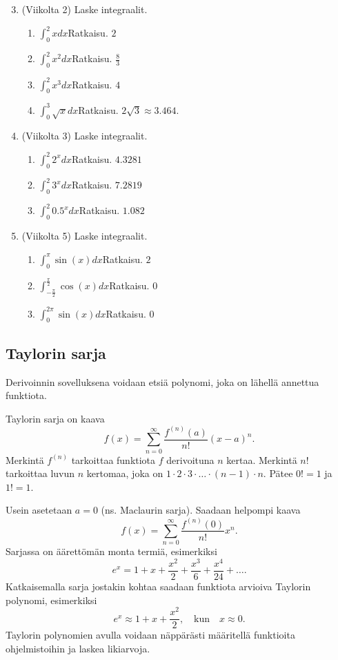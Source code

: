 \documentclass[10pt]{article}
\newcommand{\ratkaisu}[1]{\hfill{\color{blue}\quad\textrm{Ratkaisu. } #1}}
\begin{document}
\begin{enumerate}
\setcounter{enumi}{2}
\item (Viikolta 2) Laske integraalit.
\begin{enumerate}
\item $\int_0^2 xdx$\ratkaisu{$2$}
\item $\int_0^2 x^2dx$\ratkaisu{$\frac83$}
\item $\int_0^2 x^3dx$\ratkaisu{$4$}
\item $\int_0^3 \sqrt{x}dx$\ratkaisu{$2\sqrt{3}\approx 3.464.$}
\end{enumerate}
\item (Viikolta 3) Laske integraalit.
\begin{enumerate}
\item $\int_0^2 2^xdx$\ratkaisu{$4.3281$}
\item $\int_0^2 3^xdx$\ratkaisu{$7.2819$}
\item $\int_0^2 0.5^xdx$\ratkaisu{$1.082$}
\end{enumerate}
\item (Viikolta 5) Laske integraalit.
\begin{enumerate}
\item $\int_0^\pi \sin(x)dx$\ratkaisu{$2$}
\item $\int_{-\frac{\pi}{2}}^{\frac{\pi}{2}} \cos(x)dx$\ratkaisu{$0$}
\item $\int_0^{2\pi} \sin(x)dx$\ratkaisu{$0$}
\end{enumerate}
\end{enumerate}

\newpage
\subsection{Taylorin sarja}

Derivoinnin sovelluksena voidaan etsiä polynomi, joka on lähellä annettua funktiota.

Taylorin sarja on kaava
$$
f(x)=\sum_{n=0}^\infty \frac{f^{(n)}(a)}{n!}(x-a)^n.
$$
Merkintä $f^{(n)}$ tarkoittaa funktiota $f$ derivoituna $n$ kertaa. Merkintä $n!$ tarkoittaa luvun $n$ kertomaa, joka on $1\cdot 2\cdot 3\cdot\ldots\cdot (n-1)\cdot n$. Pätee $0!=1$ ja $1!=1$.

Usein asetetaan $a=0$ (ns. Maclaurin sarja). Saadaan helpompi kaava
$$
f(x)=\sum_{n=0}^\infty \frac{f^{(n)}(0)}{n!}x^n.
$$
Sarjassa on äärettömän monta termiä, esimerkiksi
$$
e^x=1+x+\frac{x^2}{2}+\frac{x^3}{6}+\frac{x^4}{24}+\ldots.
$$
Katkaisemalla sarja jostakin kohtaa saadaan funktiota arvioiva Taylorin polynomi, esimerkiksi
$$
e^x\approx 1+x+\frac{x^2}{2},\quad\textrm{kun}\quad x\approx 0.
$$
Taylorin polynomien avulla voidaan näppärästi määritellä funktioita ohjelmistoihin ja laskea likiarvoja.
\end{document}
